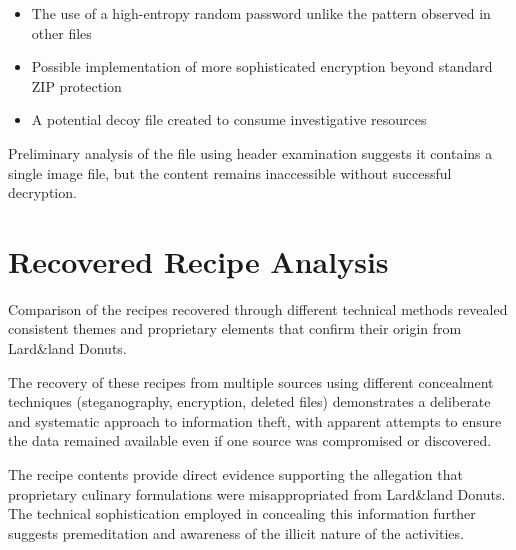 \begin{itemize}
    \item The use of a high-entropy random password unlike the pattern observed in other files
    \item Possible implementation of more sophisticated encryption beyond standard ZIP protection
    \item A potential decoy file created to consume investigative resources
\end{itemize}

Preliminary analysis of the file using header examination suggests it contains a single image file, but the content remains inaccessible without successful decryption.

\section{Recovered Recipe Analysis}
Comparison of the recipes recovered through different technical methods revealed consistent themes and proprietary elements that confirm their origin from Lard\&land Donuts.

The recovery of these recipes from multiple sources using different concealment techniques (steganography, encryption, deleted files) demonstrates a deliberate and systematic approach to information theft, with apparent attempts to ensure the data remained available even if one source was compromised or discovered.

The recipe contents provide direct evidence supporting the allegation that proprietary culinary formulations were misappropriated from Lard\&land Donuts. The technical sophistication employed in concealing this information further suggests premeditation and awareness of the illicit nature of the activities.